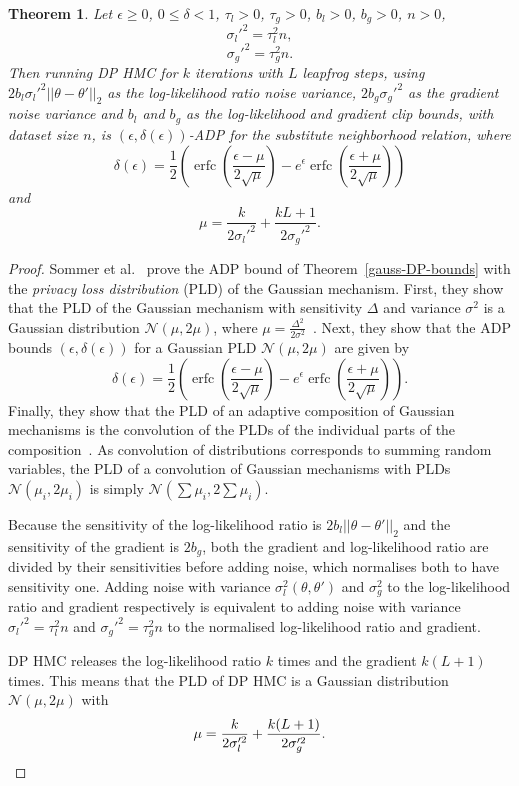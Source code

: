 \documentclass[english,twoside,openright]{HYgraduMLDS}
\newtheorem{theorem}[lemma]{Theorem}
\newcommand{\caln}{{\mathcal{N}}}
\DeclareMathOperator{\erfc}{erfc}
\begin{document}
\begin{theorem}\label{dp_hmc_theorem_adp}
  Let \(\epsilon \geq 0\), \(0 \leq \delta < 1\), \(\tau_{l} > 0\),
  \(\tau_{g} > 0\), \(b_{l} > 0\), \(b_{g} > 0\), \(n > 0\),
  \[
    \sigma_{l}'^{2} = \tau_{l}^{2}n,
  \]
  \[
    \sigma_{g}'^{2} = \tau_{g}^{2}n.
  \]
  Then running DP HMC for \(k\) iterations with \(L\) leapfrog steps,
  using \(2b_{l}\sigma_{l}'^{2}||\theta - \theta'||_{2}\) as the log-likelihood ratio
  noise variance, \(2b_{g}\sigma_{g}'^{2}\) as the gradient noise variance
  and \(b_{l}\) and \(b_{g}\) as the log-likelihood and gradient clip bounds,
  with dataset size \(n\), is \((\epsilon, \delta(\epsilon))\)-ADP for the
  substitute neighborhood relation, where
  \[
    \delta(\epsilon) = \frac{1}{2}\left(
      \erfc\left(\frac{\epsilon - \mu}{2\sqrt{\mu}}\right)
      - e^{\epsilon}\erfc\left(\frac{\epsilon + \mu}{2\sqrt{\mu}}\right)\right)
  \]
  and
  \[
    \mu = \frac{k}{2\sigma_{l}'^{2}} + \frac{kL + 1}{2\sigma_{g}'^{2}}.
  \]
\end{theorem}
\begin{proof}
Sommer et al.~\cite{Sommer2019} prove the ADP bound of Theorem~\ref{gauss-DP-bounds} with
the \emph{privacy loss distribution} (PLD) of the Gaussian mechanism. First, they
show that the PLD of the Gaussian mechanism with sensitivity \(\Delta\) and variance
\(\sigma^{2}\) is a Gaussian distribution
\(\caln(\mu, 2\mu)\), where \(\mu = \frac{\Delta^{2}}{2\sigma^{2}}\)~\cite[Lemma 11]{Sommer2019}.
Next, they show that the ADP bounds \((\epsilon, \delta(\epsilon))\) for a
Gaussian PLD \(\caln(\mu, 2\mu)\) are given by~\cite[Lemma 12]{Sommer2019}
\[
  \delta(\epsilon) = \frac{1}{2}\left(
    \erfc\left(\frac{\epsilon - \mu}{2\sqrt{\mu}}\right)
    - e^{\epsilon}\erfc\left(\frac{\epsilon + \mu}{2\sqrt{\mu}}\right)\right).
\]
Finally, they show that the PLD of an adaptive composition of Gaussian mechanisms
is the convolution of
the PLDs of the individual parts of the composition~\cite[Theorem 1]{Sommer2019}.
As convolution of distributions corresponds to summing random variables, the PLD of a
convolution of Gaussian mechanisms with PLDs \(\caln(\mu_{i}, 2\mu_{i})\) is
simply \(\caln(\sum \mu_{i}, 2\sum \mu_{i})\).

Because the sensitivity of the log-likelihood ratio is
\(2b_{l}||\theta - \theta'||_{2}\) and the sensitivity of the gradient is
\(2b_{g}\), both the gradient and log-likelihood ratio are divided by their
sensitivities before adding noise, which normalises both to have sensitivity
one. Adding noise with variance \(\sigma_{l}^2(\theta, \theta')\)
and \(\sigma_{g}^{2}\) to the log-likelihood ratio and gradient respectively
is equivalent to adding noise with variance
\(\sigma_{l}'^{2} = \tau_{l}^{2}n\) and \(\sigma_{g}'^{2} = \tau_{g}^{2}n\)
to the normalised log-likelihood ratio and gradient.

DP HMC releases the log-likelihood ratio \(k\) times and the gradient
\(k(L + 1)\) times. This means that the PLD of DP HMC is a Gaussian distribution
\(\caln(\mu, 2\mu)\) with
\[
  \mu = \frac{k}{2\sigma_{l}'^{2}} + \frac{k(L + 1)}{2\sigma_{g}'^{2}}.
  \qedhere
\]
\end{proof}
\end{document}
